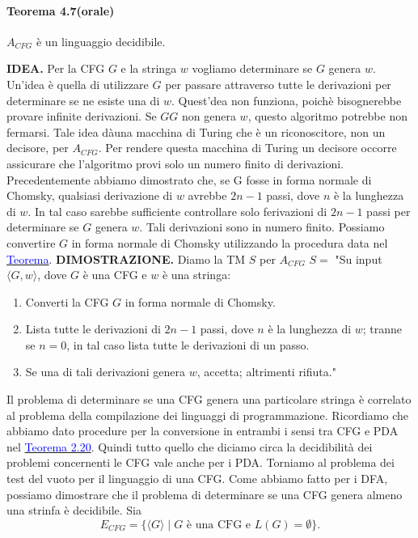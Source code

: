 \documentclass{article}
\begin{document}
\paragraph{Teorema 4.7(orale)}
\label{teorema-4.7}
$A_{CFG}$ è un linguaggio decidibile.
\newline

\hbox{\textbf{IDEA.}}
Per la CFG $G$ e la stringa $w$ vogliamo determinare se $G$ genera $w$.
Un'idea è quella di utilizzare $G$ per passare attraverso tutte le derivazioni per determinare se ne esiste una di $w$.
Quest'dea non funziona, poichè bisognerebbe provare infinite derivazioni.
Se $GG$ non genera $w$, questo algoritmo potrebbe non fermarsi.
Tale idea dàuna macchina di Turing che è un riconoscitore, non un decisore, per $A_{CFG}$.
Per rendere questa macchina di Turing un decisore occorre assicurare che l'algoritmo provi solo un numero finito di derivazioni.
Precedentemente abbiamo dimostrato che, se G fosse in forma normale di Chomsky, qualsiasi derivazione di $w$ avrebbe $2n - 1$ passi, dove $n$ è la lunghezza di $w$.
In tal caso sarebbe sufficiente controllare solo ferivazioni di $2n - 1$ passi per determinare se $G$ genera $w$.
Tali derivazioni sono in numero finito.
Possiamo convertire $G$ in forma normale di Chomsky utilizzando la procedura data nel \hyperref[Forma normale di Chomsky]{\textcolor{blue}{Teorema}}.
\vspace{1em}
\text{}
\newline
\hbox{\textbf{DIMOSTRAZIONE.}}
Diamo la TM $S$ per $A_{CFG}$
\vspace{1em}
\text{}
\newline
$S = $ "Su input $\langle G,w \rangle$, dove $G$ è una CFG e $w$ è una stringa:
\begin{enumerate}
    \item Converti la CFG $G$ in forma normale di Chomsky.
    \item Lista tutte le derivazioni di $2n - 1$ passi, dove $n$ è la lunghezza di $w$; tranne se $n = 0$, in tal caso lista tutte le derivazioni di un passo.
    \item Se una di tali derivazioni genera $w$, accetta; altrimenti rifiuta."
\end{enumerate}

Il problema di determinare se una CFG genera una particolare stringa è correlato al problema della compilazione dei linguaggi di programmazione.
Ricordiamo che abbiamo dato procedure per la conversione in entrambi i sensi tra CFG e PDA nel \hyperref[teorema-2.20]{\textcolor{blue}{Teorema 2.20}}.
Quindi tutto quello che diciamo circa la decidibilità dei problemi concernenti le CFG vale anche per i PDA.
Torniamo al problema dei test del vuoto per il linguaggio di una CFG.
Come abbiamo fatto per i DFA, possiamo dimostrare che il problema di determinare se una CFG genera almeno una strinfa è decidibile. Sia
$$
E_{CFG} = \{\langle G \rangle \mid G \text{ è una CFG e } L(G) = \emptyset \}.
$$
\end{document}
